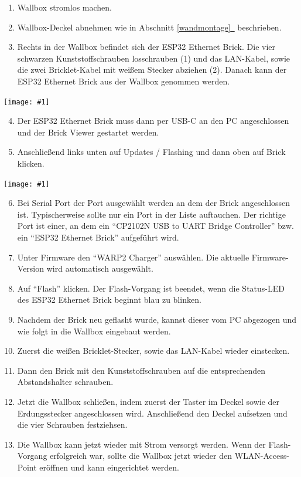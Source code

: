 \documentclass[a4paper,10pt]{article}
\newcommand{\gfx}[1]{\texttt{[image: \#1]}}
\newcommand*{\fullref}[1]{Abschnitt \hyperref[{#1}]{\ref*{#1}~\nameref*{#1}}}
\begin{document}
\begin{multicols*}{2}
    \begin{enumerate}
        \item Wallbox stromlos machen.
        \item Wallbox-Deckel abnehmen wie in \fullref{wandmontage} beschrieben.
        \item Rechts in der Wallbox befindet sich der ESP32 Ethernet Brick. Die
		vier schwarzen Kunststoffschrauben losschrauben (1) und das LAN-Kabel,
		sowie die zwei Bricklet-Kabel mit weißem Stecker abziehen (2). Danach
		kann der ESP32 Ethernet Brick aus der Wallbox genommen werden.
    \end{enumerate}
    \gfx{./img_warp2/resized/warp_factory_reset_cropped}
    \begin{enumerate}
        \setcounter{enumi}{3}
        \item Der ESP32 Ethernet Brick muss dann per USB-C an den PC
		angeschlossen und der Brick Viewer gestartet werden.
        \item Anschließend links unten auf Updates / Flashing und dann oben auf
		Brick klicken.
    \end{enumerate}
    \gfx{./img_warp2/resized/warp_factory_flash}
    \begin{enumerate}
        \setcounter{enumi}{5}
        \item Bei Serial Port der Port ausgewählt werden an dem der Brick angeschlossen ist.
              Typischerweise sollte nur ein Port in der Liste auftauchen.
              Der richtige Port ist einer, an dem ein \enquote{CP2102N USB to UART Bridge Controller} bzw. ein \enquote{ESP32 Ethernet Brick} aufgeführt wird.
        \item Unter Firmware den \enquote{WARP2 Charger} auswählen. Die aktuelle Firmware-Version wird automatisch ausgewählt.
        \item Auf \enquote{Flash} klicken. Der Flash-Vorgang ist beendet, wenn die Status-LED des ESP32 Ethernet Brick beginnt blau zu blinken.
        \item Nachdem der Brick neu geflasht wurde, kannst dieser vom PC abgezogen und wie folgt in die Wallbox eingebaut werden.
        \item Zuerst die weißen Bricklet-Stecker, sowie das LAN-Kabel wieder einstecken.
        \item Dann den Brick mit den Kunststoffschrauben auf die entsprechenden Abstandshalter schrauben.
        \item Jetzt die Wallbox schließen, indem zuerst der Taster im Deckel sowie der Erdungsstecker angeschlossen wird. Anschließend den Deckel aufsetzen und die vier Schrauben festziehsen.
        \item Die Wallbox kann jetzt wieder mit Strom versorgt werden. Wenn der Flash-Vorgang erfolgreich war, sollte die Wallbox jetzt wieder den WLAN-Access-Point eröffnen und kann eingerichtet werden.
    \end{enumerate}


\end{multicols*}
\end{document}
